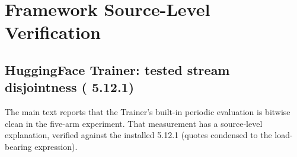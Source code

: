 \section{Framework Source-Level Verification}
\label{sec:framework}

\subsection{HuggingFace Trainer: tested stream disjointness
( 5.12.1)}

The main text reports that the Trainer's built-in periodic evaluation is
bitwise clean in the five-arm experiment. That measurement has a
source-level explanation, verified against the installed
 5.12.1 (quotes condensed to the load-bearing
expression).


